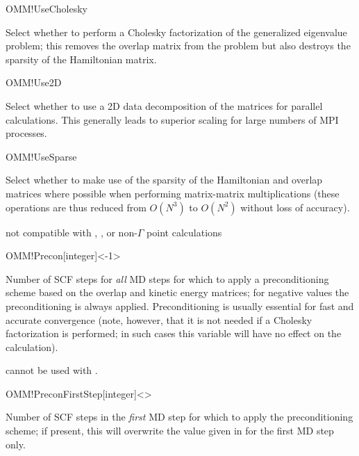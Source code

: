 \begin{fdflogicalT}{OMM!UseCholesky}

  Select whether to perform a Cholesky factorization of the
  generalized eigenvalue problem; this removes the overlap matrix from
  the problem but also destroys the sparsity of the Hamiltonian
  matrix.

\end{fdflogicalT}

\begin{fdflogicalT}{OMM!Use2D}
  
  Select whether to use a 2D data decomposition of the matrices for
  parallel calculations. This generally leads to superior scaling for
  large numbers of MPI processes.

\end{fdflogicalT}

\begin{fdflogicalF}{OMM!UseSparse}

  Select whether to make use of the sparsity of the Hamiltonian and
  overlap matrices where possible when performing matrix-matrix
  multiplications (these operations are thus reduced from $O(N^3)$ to
  $O(N^2)$ without loss of accuracy).

  \note not compatible with ,
  , or non-$\Gamma$ point calculations

\end{fdflogicalF}

\begin{fdfentry}{OMM!Precon}[integer]<-1>
  
  Number of SCF steps for \emph{all} MD steps for which to apply a
  preconditioning scheme based on the overlap and kinetic energy
  matrices; for negative values the preconditioning is always
  applied. Preconditioning is usually essential for fast and accurate
  convergence (note, however, that it is not needed if a Cholesky
  factorization is performed; in such cases this variable will have no
  effect on the calculation).

  \note cannot be used with .

\end{fdfentry}


\begin{fdfentry}{OMM!PreconFirstStep}[integer]<>
  
  Number of SCF steps in the \emph{first} MD step for which to apply
  the preconditioning scheme; if present, this will overwrite the
  value given in  for the first MD step only.

\end{fdfentry}

